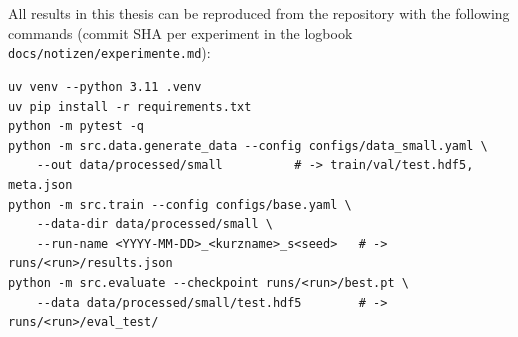 \chapter{}
\label{app:configs}

\chapter{}
\label{app:abbildungen}

\chapter{}
\label{app:reproduktion}

%
{All results in this thesis can be reproduced from the repository with the following commands (commit SHA per experiment in the logbook \texttt{docs/notizen/experimente.md}):}
{\small
\begin{verbatim}
uv venv --python 3.11 .venv
uv pip install -r requirements.txt
python -m pytest -q
python -m src.data.generate_data --config configs/data_small.yaml \
    --out data/processed/small          # -> train/val/test.hdf5, meta.json
python -m src.train --config configs/base.yaml \
    --data-dir data/processed/small \
    --run-name <YYYY-MM-DD>_<kurzname>_s<seed>   # -> runs/<run>/results.json
python -m src.evaluate --checkpoint runs/<run>/best.pt \
    --data data/processed/small/test.hdf5        # -> runs/<run>/eval_test/
\end{verbatim}
}
